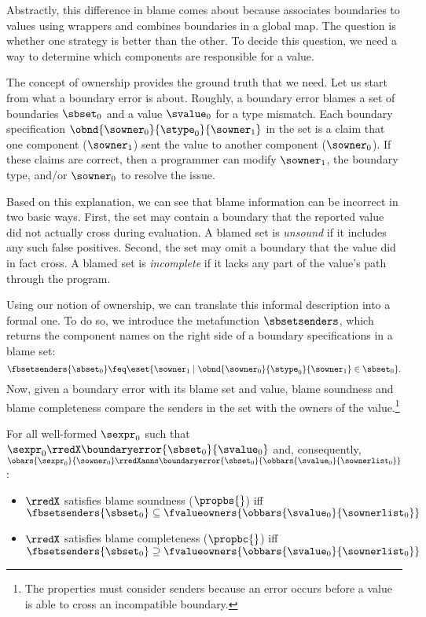 Abstractly, this difference in blame comes about because \Aname{} associates
 boundaries to values using wrappers and \Tname{} combines
 boundaries in a global map. The question is whether one strategy
 is better than the other. To decide this question, we need a way to determine
 which components are responsible for a value.

The concept of ownership provides the ground truth that we need.
Let us start from what a boundary error is about.
Roughly, a boundary error blames a set of boundaries $\sbset_0$ and a value
$\svalue_0$ for a type mismatch.
Each boundary specification $\obnd{\sowner_0}{\stype_0}{\sowner_1}$ in the
set is a claim that one component ($\sowner_1$) sent the value to another
component ($\sowner_0$).
If these claims are correct, then a programmer can
modify $\sowner_1$, the boundary type, and/or $\sowner_0$
to resolve the issue.

Based on this explanation, we can see that blame information can be
incorrect in two basic ways.  First, the set may contain a boundary that
the reported value did not actually cross during evaluation.  A blamed set
is \emph{unsound}\/ if it includes any such false positives.  Second, the
set may omit a boundary that the value did in fact cross.  A blamed set is
\emph{incomplete}\/ if it lacks any part of the value's path through the program.

Using our notion of ownership, we can translate this informal description
into a formal one. To do so, we introduce the metafunction $\sbsetsenders$,
which returns the component names on the right side of a boundary
specifications in a blame set:
$$ \fbsetsenders{\sbset_0} 
   \feq 
   \eset{\sowner_1 \mid \obnd{\sowner_0}{\stype_0}{\sowner_1} \in \sbset_0} .
$$ 
Now, given a boundary error with its blame set and value,
 blame soundness and blame completeness compare the senders in the set with
 the owners of the value.\footnote{The properties must consider senders because an error occurs before a value
 is able to cross an incompatible boundary.}

\begin{definition}
  For all well-formed $\sexpr_0$ such that
  $\sexpr_0 \rredX \boundaryerror{\sbset_0}{\svalue_0}$ and,
  consequently,
  $\obars{\sexpr_0}{\sowner_0} \rredXanns \boundaryerror{\sbset_0}{\obbars{\svalue_0}{\sownerlist_0}}$:
  \begin{itemize}
    \itemsep0.1ex
    \item
      $\rredX$ satisfies blame soundness ($\propbs{}$) 
      iff
      $\fbsetsenders{\sbset_0} \subseteq \fvalueowners{\obbars{\svalue_0}{\sownerlist_0}}$
    \item
      $\rredX$ satisfies blame completeness ($\propbc{}$)
      iff
      $\fbsetsenders{\sbset_0} \supseteq \fvalueowners{\obbars{\svalue_0}{\sownerlist_0}}$
  \end{itemize}
\end{definition}

